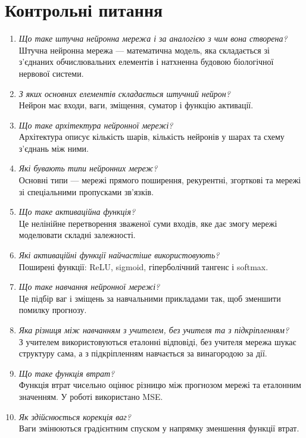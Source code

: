 \documentclass[12pt,a4paper]{article}
\begin{document}
\section{Контрольні питання}
\begin{enumerate}[leftmargin=*]
\item \textit{Що таке штучна нейронна мережа і за аналогією з чим вона створена?}\\
Штучна нейронна мережа --- математична модель, яка складається зі з'єднаних обчислювальних елементів і натхненна будовою біологічної нервової системи.
\item \textit{З яких основних елементів складається штучний нейрон?}\\
Нейрон має входи, ваги, зміщення, суматор і функцію активації.
\item \textit{Що таке архітектура нейронної мережі?}\\
Архітектура описує кількість шарів, кількість нейронів у шарах та схему з'єднань між ними.
\item \textit{Які бувають типи нейронних мереж?}\\
Основні типи --- мережі прямого поширення, рекурентні, згорткові та мережі зі спеціальними пропусками зв'язків.
\item \textit{Що таке активаційна функція?}\\
Це нелінійне перетворення зваженої суми входів, яке дає змогу мережі моделювати складні залежності.
\item \textit{Які активаційні функції найчастіше використовують?}\\
Поширені функції: ReLU, sigmoid, гіперболічний тангенс і softmax.
\item \textit{Що таке навчання нейронної мережі?}\\
Це підбір ваг і зміщень за навчальними прикладами так, щоб зменшити помилку прогнозу.
\item \textit{Яка різниця між навчанням з учителем, без учителя та з підкріпленням?}\\
З учителем використовуються еталонні відповіді, без учителя мережа шукає структуру сама, а з підкріпленням навчається за винагородою за дії.
\item \textit{Що таке функція втрат?}\\
Функція втрат чисельно оцінює різницю між прогнозом мережі та еталонним значенням. У роботі використано MSE.
\item \textit{Як здійснюється корекція ваг?}\\
Ваги змінюються градієнтним спуском у напрямку зменшення функції втрат.

\end{enumerate}
\end{document}
